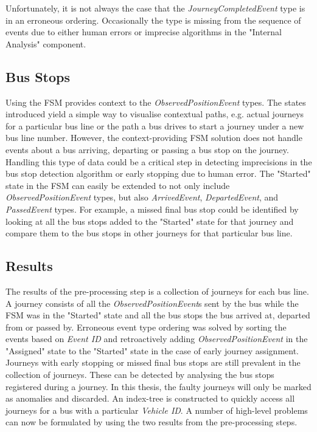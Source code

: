 Unfortunately, it is not always the case that the \textit{JourneyCompletedEvent} type is in an erroneous ordering.
Occasionally the type is missing from the sequence of events due to either human errors or imprecise algorithms in the "Internal Analysis" component.

\subsection{Bus Stops}
Using the FSM provides context to the \textit{ObservedPositionEvent} types.
The states introduced yield a simple way to visualise contextual paths, e.g. actual journeys for a particular bus line or the path a bus drives to start a journey under a new bus line number.
However, the context-providing FSM solution does not handle events about a bus arriving, departing or passing a bus stop on the journey.
Handling this type of data could be a critical step in detecting imprecisions in the bus stop detection algorithm or early stopping due to human error.
The "Started" state in the FSM can easily be extended to not only include \textit{ObservedPositionEvent} types, but also \textit{ArrivedEvent}, \textit{DepartedEvent}, and \textit{PassedEvent} types.
For example, a missed final bus stop could be identified by looking at all the bus stops added to the "Started" state for that journey and compare them to the bus stops in other journeys for that particular bus line.

\subsection{Results}
The results of the pre-processing step is a collection of journeys for each bus line.
A journey consists of all the \textit{ObservedPositionEvent}s sent by the bus while the FSM was in the "Started" state and all the bus stops the bus arrived at, departed from or passed by.
Erroneous event type ordering was solved by sorting the events based on \textit{Event ID} and retroactively adding \textit{ObservedPositionEvent} in the "Assigned" state to the "Started" state in the case of early journey assignment.
Journeys with early stopping or missed final bus stops are still prevalent in the collection of journeys.
These can be detected by analysing the bus stops registered during a journey.
In this thesis, the faulty journeys will only be marked as anomalies and discarded.
An index-tree is constructed to quickly access all journeys for a bus with a particular \textit{Vehicle ID}.
A number of high-level problems can now be formulated by using the two results from the pre-processing steps.

